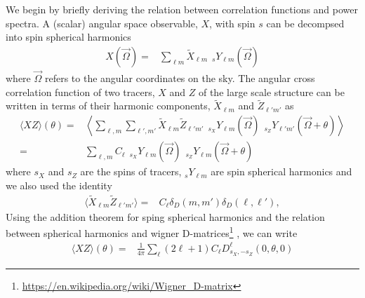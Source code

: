 \documentclass[\docopts]{\docclass}
\begin{document}
We begin by briefly deriving the relation between correlation functions and power spectra.
A (scalar) angular space observable, $X$, with spin $s$ can be decompsed into spin spherical
harmonics
\begin{align}\label{eq:X_harmonic}
  X(\vec \Omega)=&\sum_{\ell m}\tilde X_{\ell m} {\hspace{5pt}}_sY_{\ell m}(\vec \Omega)
\end{align}
where $\vec \Omega$ refers to the angular coordinates on the sky.
The angular cross correlation function of two tracers, $X$ and $Z$ of the large scale
structure can be written in terms of their harmonic components, $\tilde X_{\ell m}$ and $\tilde Z_{\ell' m'}$ as
\begin{align}
  \langle XZ \rangle(\theta)=&\left\langle\sum_{\ell,m}\sum_{\ell', m'}\tilde X_{\ell m}\tilde
  Z_{\ell' m'}{\hspace{5pt}}_{s_X}Y_{\ell m}(\vec \Omega){\hspace{5pt}}_{s_Z}Y_{\ell'm'}(\vec \Omega+\theta)\right\rangle\\
  =&\sum_{\ell,m}C_{\ell}{\hspace{5pt}}_{s_X}Y_{\ell m}(\vec \Omega){\hspace{5pt}}_{s_Z}Y_{\ell m}(\vec \Omega+\theta)%
\end{align}
where $s_X$ and $s_Z$ are the spins of tracers, $_{s}Y_{\ell m}$ are spin spherical harmonics and
we also used the identity
\begin{align}
  \langle\tilde X_{\ell m}\tilde Z_{\ell' m'}\rangle=&C_{\ell}\delta_D(m,m')\delta_D(\ell,\ell'),
\end{align}
Using the addition theorem for sping spherical harmonics and the relation between spherical
harmonics and wigner D-matrices\footnote{\url{https://en.wikipedia.org/wiki/Wigner_D-matrix}}
\citep{Ng1999}, we can write
\begin{align}
  \langle XZ
  \rangle(\theta)=&\frac{1}{4\pi}\sum_{\ell}(2\ell+1)C_{\ell}D^{\ell}_{s_X,-s_Z}(0,\theta,0)
\end{align}
\end{document}
